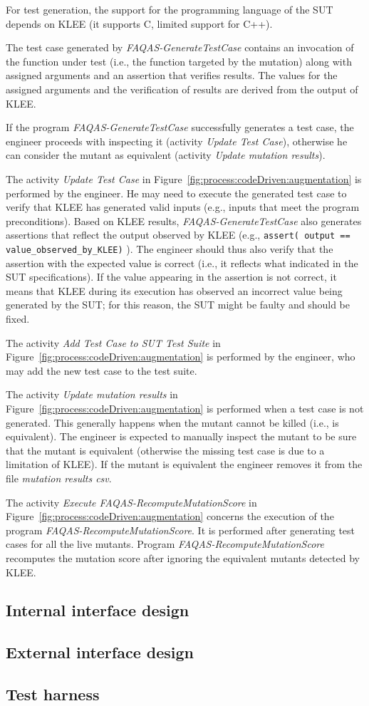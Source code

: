 For test generation, the support for the programming language of the SUT depends on KLEE (it supports C, limited support for C++).

The test case generated by \emph{FAQAS-GenerateTestCase} contains an invocation of the function under test (i.e., the function targeted  by the mutation) along with assigned arguments and an assertion that verifies results. The values for the assigned arguments and the verification of results are derived from the output of KLEE.

If the program \emph{FAQAS-GenerateTestCase} successfully generates a test case, the engineer proceeds with inspecting it (activity \emph{Update Test  Case}), otherwise he can consider the mutant as equivalent (activity \emph{Update mutation results}).

The activity \emph{Update Test  Case} in Figure~\ref{fig:process:codeDriven:augmentation} is performed by the engineer. He may need to execute the generated test case to verify that KLEE has generated valid inputs (e.g., inputs that meet the program preconditions). Based on KLEE results, \emph{FAQAS-GenerateTestCase} also generates assertions that reflect the output observed by KLEE (e.g., \texttt{assert( output == value\_observed\_by\_KLEE)} ). The engineer should thus also verify that the assertion with the expected value is correct (i.e., it reflects what indicated in the SUT specifications). If the value appearing in the assertion is not correct, it means that KLEE during its execution has observed an incorrect value being generated by the SUT; for this reason, the SUT might be faulty and should be fixed.

The activity \emph{Add Test Case to SUT Test Suite} in Figure~\ref{fig:process:codeDriven:augmentation} is performed by the engineer, who may add the new test case to the test suite.

The activity \emph{Update mutation results} in Figure~\ref{fig:process:codeDriven:augmentation} is performed when a test case is not generated. This generally happens when the mutant cannot be killed (i.e., is equivalent). The engineer is expected to manually inspect the mutant to be sure that the mutant is equivalent (otherwise the missing test case is due to a limitation of KLEE). If the mutant is equivalent the engineer removes it from the file \emph{mutation results csv}.

The activity \emph{Execute FAQAS-RecomputeMutationScore} in Figure~\ref{fig:process:codeDriven:augmentation}  concerns the execution of the program \emph{FAQAS-RecomputeMutationScore}. It is performed after generating test cases for all the live mutants. Program \emph{FAQAS-RecomputeMutationScore} recomputes the mutation score after ignoring the equivalent mutants detected by KLEE.

\subsection{Internal interface design}

\subsection{External interface design}

\subsection{Test harness}






